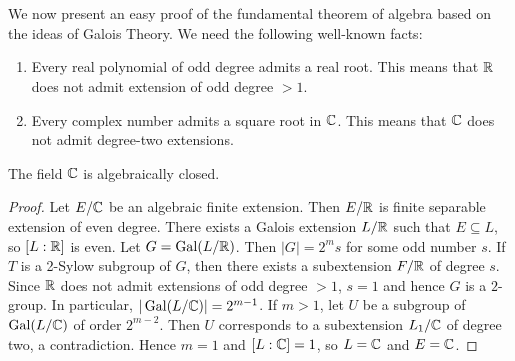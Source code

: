 \chapter{}


We now present an easy proof of the fundamental theorem 
of algebra based on the ideas of Galois Theory. 
We need the following well-known facts:
\begin{enumerate}
\item Every real polynomial of odd degree admits a real root. This means that $\mathbb{R}$ 
does not admit extension of odd degree $>1$. 
\item Every complex number admits a square root in $\mathbb{C}$. This means that $\mathbb{C}$ 
does not admit degree-two extensions.
\end{enumerate}

\begin{theorem}
The field $\mathbb{C}$ is algebraically closed.
\end{theorem}

\begin{proof}
    Let $E/\mathbb{C}$ be an algebraic finite extension. Then $E/\mathbb{R}$ 
    is finite separable extension of even degree. There exists a Galois
    extension 
    $L/\mathbb{R}$ such that $E\subseteq L$, so $[L:\mathbb{R}]$ is even. Let $G=\operatorname{Gal}(L/\mathbb{R})$. 
    Then $|G|=2^ms$ for some odd number $s$. If $T$ is a 2-Sylow subgroup
    of $G$, 
    then there exists a subextension $F/\mathbb{R}$ of degree $s$. Since 
    $\mathbb{R}$ does not admit extensions of odd degree $>1$, $s=1$ and
    hence $G$ is a $2$-group. In particular, $|\operatorname{Gal}(L/\mathbb{C})|=2^{m-1}$. If $m>1$, 
    let $U$ be a subgroup of $\operatorname{Gal}(L/\mathbb{C})$ of order $2^{m-2}$. Then $U$ corresponds 
    to a subextension $L_1/\mathbb{C}$ of degree two, a contradiction. Hence $m=1$ 
    and $[L:\mathbb{C}]=1$, so $L=\mathbb{C}$ and $E=\mathbb{C}$. 
\end{proof}